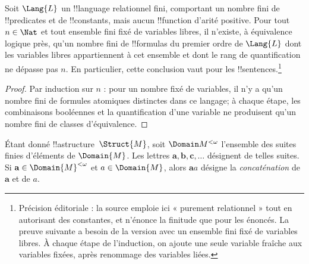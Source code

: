 \documentclass[../../../include/open-logic-section]{subfiles}
\begin{document}
\begin{prop}
  Soit $\Lang{L}$ un !!{language} relationnel fini, comportant un
  nombre fini de !!{predicate}s et de !!{constant}s, mais aucun
  !!{function} d'arité positive. Pour tout $n \in \Nat$ et tout
  ensemble fini fixé de variables libres, il n'existe, à
  équivalence logique près, qu'un nombre fini de !!{formula}s
  du premier ordre de $\Lang{L}$ dont les variables libres
  appartiennent à cet ensemble et dont le rang de quantification
  ne dépasse pas $n$. En particulier, cette conclusion vaut
  pour les !!{sentence}s.\footnote{Précision éditoriale : la source emploie ici « purement relationnel » tout en autorisant des constantes, et n'énonce la finitude que pour les énoncés. La preuve suivante a besoin de la version avec un ensemble fini fixé de variables libres. À chaque étape de l'induction, on ajoute une seule variable fraîche aux variables fixées, après renommage des variables liées.}
\end{prop}

\begin{proof}
  Par induction sur $n$ : pour un nombre fixé de variables,
  il n'y a qu'un nombre fini de formules atomiques distinctes
  dans ce langage; à chaque étape, les combinaisons booléennes
  et la quantification d'une variable ne produisent qu'un
  nombre fini de classes d'équivalence.
\end{proof}

\begin{defn}
  Étant donné !!a{structure}~$\Struct{M}$, soit
  $\Domain M^{<\omega}$ l'ensemble des suites finies d'éléments
  de $\Domain{M}$. Les lettres $\mathbf{a}, \mathbf{b},
  \mathbf{c}, \ldots$ désignent de telles suites. Si
  $\mathbf{a} \in \Domain{M}^{<\omega}$ et $a \in \Domain{M}$,
  alors $\mathbf{a}a$ désigne la \emph{concaténation} de
  $\mathbf{a}$ et de $a$.
\end{defn}
\end{document}
